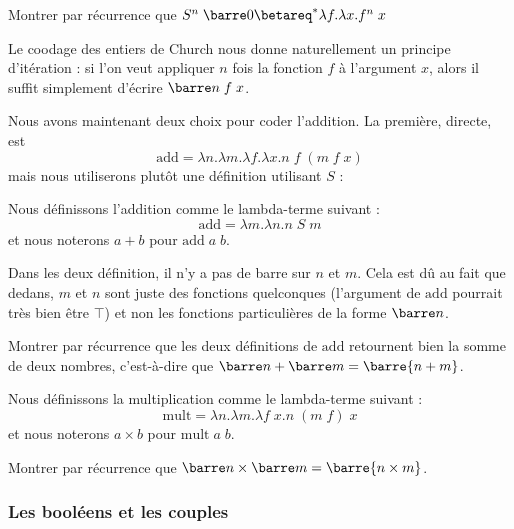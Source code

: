 \begin{exo}
    Montrer par récurrence que $S^n\; \barre 0 \betareq^* \lambda f.\lambda x. f^n\; x$
\end{exo}

\begin{rmk}
    Le coodage des entiers de Church nous donne naturellement un principe d'itération : si l'on veut appliquer $n$ fois la fonction $f$ à l'argument $x$, alors il suffit simplement d'écrire $\barre n\;f\;x$.
\end{rmk}

Nous avons maintenant deux choix pour coder l'addition. La première, directe, est $$\mathrm{add} = \lambda n.\lambda m. \lambda f.\lambda x. n\;f\;(m\;f\;x)$$ mais nous utiliserons plutôt une définition utilisant $S$ :

\begin{defi}[Addition]
    Nous définissons l'addition comme le lambda-terme suivant :
    $$\mathrm{add} = \lambda m.\lambda n.n\; S\; m$$ et nous noterons $a+b$ pour $\mathrm{add}\; a\; b$.
\end{defi}

\begin{rmk}
    Dans les deux définition, il n'y a pas de barre sur $n$ et $m$. Cela est dû au fait que dedans, $m$ et $n$ sont juste des fonctions quelconques (l'argument de $\mathrm{add}$ pourrait très bien être $\top$) et non les fonctions particulières de la forme $\barre n$.
\end{rmk}

\begin{exo}
    Montrer par récurrence que les deux définitions de $\mathrm{add}$ retournent bien la somme de deux nombres, c'est-à-dire que $\barre n+\barre m = \barre{n+m}$.
\end{exo}

\begin{defi}[Multiplication]
    Nous définissons la multiplication comme le lambda-terme suivant :
    $$\mathrm{mult} = \lambda n.\lambda m. \lambda f\;x. n\;(m\;f)\; x$$ et nous noterons $a\times b$ pour $\mathrm{mult}\;a\;b$.
\end{defi}

\begin{exo}
    Montrer par récurrence que $\barre n\times \barre m = \barre{n\times m}$.
\end{exo}

\subsubsection{Les booléens et les couples}

